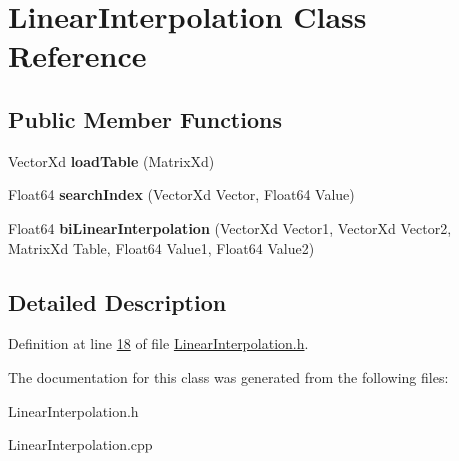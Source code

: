 \hypertarget{class_linear_interpolation}{}\section{Linear\+Interpolation Class Reference}
\label{class_linear_interpolation}
\subsection*{Public Member Functions}
\begin{DoxyCompactItemize}
\item 
\mbox{\label{class_linear_interpolation_a7cee2bfbc8363230e187792369a9bef1}} 
Vector\+Xd {\bfseries load\+Table} (Matrix\+Xd)
\item 
\mbox{\label{class_linear_interpolation_a0be6504a98fabcd63d81d30a2d2d9add}} 
Float64 {\bfseries search\+Index} (Vector\+Xd Vector, Float64 Value)
\item 
\mbox{\label{class_linear_interpolation_ab6a7021448fee7403119ad0abfa80681}} 
Float64 {\bfseries bi\+Linear\+Interpolation} (Vector\+Xd Vector1, Vector\+Xd Vector2, Matrix\+Xd Table, Float64 Value1, Float64 Value2)
\end{DoxyCompactItemize}


\subsection{Detailed Description}


Definition at line \hyperlink{_linear_interpolation_8h_source_l00018}{18} of file \hyperlink{_linear_interpolation_8h_source}{Linear\+Interpolation.\+h}.



The documentation for this class was generated from the following files\+:\begin{DoxyCompactItemize}
\item 
Linear\+Interpolation.\+h\item 
Linear\+Interpolation.\+cpp\end{DoxyCompactItemize}
